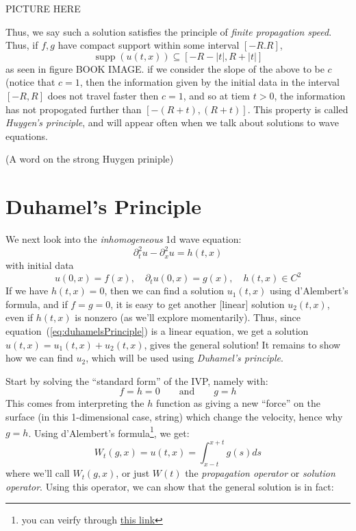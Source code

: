 \documentclass{book}
\newcommand{\sse}{\subseteq}
\newcommand{\supp}{\operatorname{supp}}
\begin{document}
PICTURE HERE

Thus, we say such a solution satisfies the principle of \emph{finite propagation speed}. Thus, if $f,g$ have compact
support within some interval $[-R. R]$,
\[
	\supp(u(t,x)) \sse [-R-|t|, R+|t|]
\]
as seen in figure BOOK IMAGE. if we consider the slope of the above to be $c$ (notice that $c= 1$, then the information
given by the initial data in the interval $[-R, R]$ does not travel faster then $c =1$, and so at tiem $t > 0$, the
information has not propogated further than $[-(R+t), (R+t)]$. This property is called \emph{Huygen's principle}, and
will appear often when we talk about solutions to wave equations.

(A word on the strong Huygen priniple)

\section{Duhamel's Principle}

We next look into the \emph{inhomogeneous} 1d wave equation:
\begin{equation}\label{eq:duhamelsPrinciple}
	\partial_t^2 u - \partial_x^2 u = h(t,x)
\end{equation}
with initial data
\[
	u(0,x) = f(x),\quad\partial_t u(0,x) = g(x),\quad h(t,x)\in C^2
\]
If we have $h(t,x) = 0$, then we can find a solution $u_1(t,x)$ using d'Alembert's formula, and if $f = g = 0$, it is
easy to get another [linear] solution $u_2(t,x)$, even if $h(t,x)$ is nonzero (as we'll explore momentarily). Thus, since
equation~(\ref{eq:duhamelsPrinciple}) is a linear equation,  we get a solution $u(t,x) = u_1(t,x) + u_2(t,x)$, gives the general solution! It remains to show how we can find $u_2$,
which will be used using \emph{Duhamel's principle}.

Start by solving the ``standard form'' of the IVP, namely with:
\[
	f = h = 0 \qquad \text{and} \qquad  g = h
\]
This comes from interpreting the $h$ function as giving a new ``force'' on the surface (in this 1-dimensional
case, string) which change the velocity, hence why $g = h$. Using d'Alembert's formula\footnote{you can veirfy
through
\href{https://math.stackexchange.com/questions/2509460/non-homogeneous-1-dimensional-wave-equation-with-arbitrary-initial-boundary-cond}{this
link}}, we get:
\[
	W_t(g, x) = u(t,x) = \int_{x-t}^{x+t}g(s)ds
\]
where we'll call $W_t(g, x)$, or just $W(t)$ the \emph{propagation operator} or \emph{solution operator}. Using this
operator, we can show that the general solution is in fact:
\end{document}
